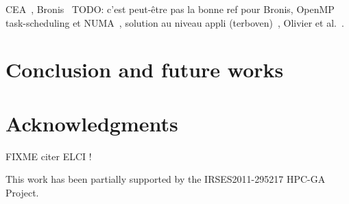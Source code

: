\documentclass{Styles/llncs}
\begin{document}
CEA~\cite{DBLP:conf/europar/Clet-OrtegaCP14},
Bronis~\cite{DBLP:journals/sp/OlivierSSP13} TODO: c'est peut-être pas
la bonne ref pour Bronis, OpenMP task-scheduling et
NUMA~\cite{DBLP:journals/corr/Tahan14}, solution au niveau appli
(terboven)~\cite{DBLP:conf/europar/TerbovenSCM12}, Olivier et al.~\cite{DBLP:journals/ijhpca/OlivierPWSP12}.

\section{Conclusion and future works}

\section*{Acknowledgments}

FIXME citer ELCI !

This work has been partially supported by the IRSES2011-295217
HPC-GA Project.

  \small 
  
\end{document}
